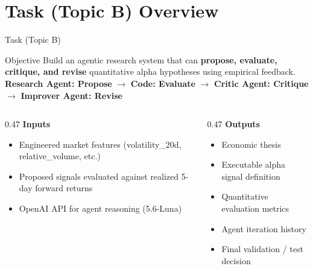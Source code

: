 \documentclass[10pt,aspectratio=169]{beamer}
\newcommand{\code}[1]{\texttt{\small #1}}
\begin{document}
\section{Task (Topic B) Overview}
\begin{frame}{Task (Topic B)}
  \begin{block}{Objective}
    Build an agentic research system that can
    \textbf{propose, evaluate, critique, and revise}
    quantitative alpha hypotheses using empirical feedback.\\
   \textbf{Research Agent: Propose} $\rightarrow$ \textbf{Code: Evaluate} $\rightarrow$ \textbf{Critic Agent: Critique}\\
   $\rightarrow$ \textbf{Improver Agent: Revise}
  \end{block}
  \small
  \begin{columns}[T,onlytextwidth]
    \begin{column}{0.47\textwidth}
      \textbf{Inputs}
      \begin{itemize}
        \item Engineered market features (volatility\_20d, relative\_volume, etc.)
       \item Proposed signals evaluated against realized 5-day forward returns
       \item OpenAI API for agent reasoning (5.6-Luna)
      \end{itemize}
    \end{column}
    \begin{column}{0.47\textwidth}
      \textbf{Outputs}
      \begin{itemize}
        \item Economic thesis
        \item Executable alpha signal definition
        \item Quantitative evaluation metrics
        \item Agent iteration history
        \item Final validation / test decision
      \end{itemize}
    \end{column}
  \end{columns}

  \vspace{0.18cm}

\end{frame}
\end{document}
